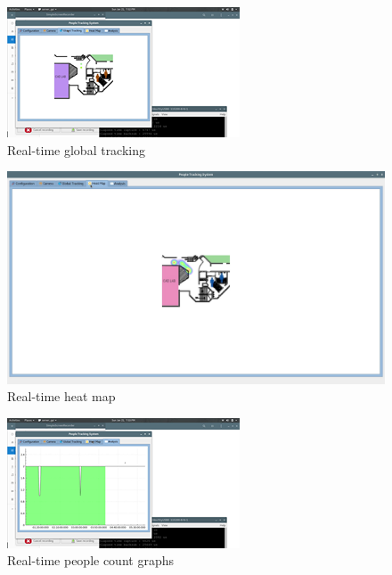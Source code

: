 \documentclass[12pt,a4paper]{report}
\begin{document}
\begin{figure}[H]
  \centering
  \includegraphics[width=\textwidth]{qt_tracking.png}
  \caption{Real-time global tracking}
  \label{qt_graph2}
\end{figure}

\begin{figure}[H]
  \centering
  \includegraphics[width=\textwidth]{qt_heatmap.png}
  \caption{Real-time heat map}
  \label{qt_graph3}
\end{figure}

\begin{figure}[H]
  \centering
  \includegraphics[width=\textwidth]{qt_count.png}
  \caption{Real-time people count graphs}
  \label{qt_graph1}
\end{figure}
\end{document}
